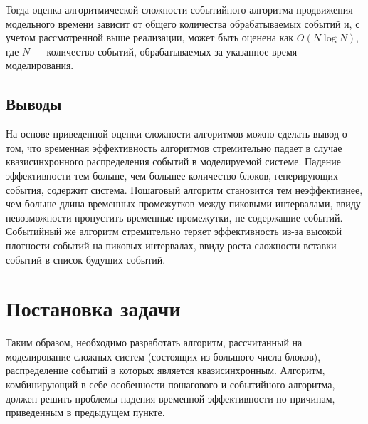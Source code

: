 Тогда оценка алгоритмической сложности событийного алгоритма продвижения модельного времени зависит от общего количества обрабатываемых событий и, с учетом рассмотренной выше реализации, может быть оценена как $O(N\log{N})$, где $N$ --- количество событий, обрабатываемых за указанное время моделирования.

\subsection{Выводы}
На основе приведенной оценки сложности алгоритмов можно сделать вывод о том, что временная эффективность алгоритмов стремительно падает в случае квазисинхронного распределения событий в моделируемой системе. Падение эффективности тем больше, чем большее количество блоков, генерирующих события, содержит система.
Пошаговый алгоритм становится тем неэффективнее, чем больше длина временных промежутков между пиковыми интервалами, ввиду невозможности пропустить временные промежутки, не содержащие событий. Событийный же алгоритм стремительно теряет эффективность из-за высокой плотности событий на пиковых интервалах, ввиду роста сложности вставки событий в список будущих событий.

\section{Постановка задачи}
Таким образом, необходимо разработать алгоритм, рассчитанный на моделирование сложных систем (состоящих из большого числа блоков), распределение событий в которых является квазисинхронным. Алгоритм, комбинирующий в себе особенности пошагового и событийного алгоритма, должен решить проблемы падения временной эффективности по причинам, приведенным в предыдущем пункте.

